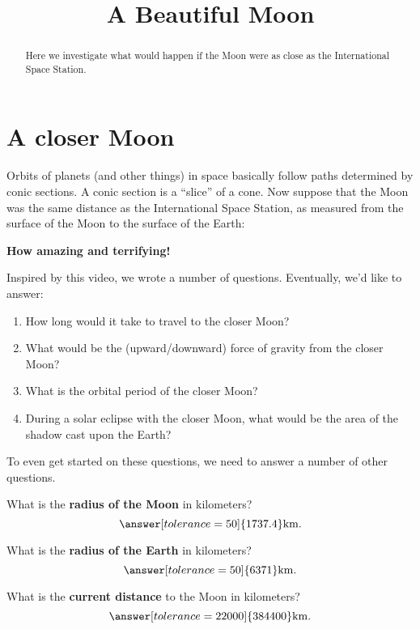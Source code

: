 \documentclass{ximera}
\title{A Beautiful Moon}
\begin{document}
\begin{abstract}
Here we investigate what would happen if the Moon were as close as the
International Space Station.
\end{abstract}
\maketitle

\section{A closer Moon}

Orbits of planets (and other things) in space basically follow paths
determined by conic sections. A conic section is a ``slice'' of a
cone. Now suppose that the Moon was the same distance as the International
Space Station, as measured from the surface of the Moon to the surface
of the Earth: 

\begin{center}
\textbf{How amazing and terrifying!}
\end{center}

Inspired by this video, we wrote a number of questions. Eventually,
we'd like to answer:
\begin{enumerate}
\item How long would it take to travel to the closer Moon?
\item What would be the (upward/downward) force of gravity from the
  closer Moon?
\item What is the orbital period of the closer Moon?
\item During a solar eclipse with the closer Moon, what would be the
  area of the shadow cast upon the Earth?
\end{enumerate}

To even get started on these questions, we need to answer a number of
other questions.

\begin{question}
  What is the \textbf{radius of the Moon} in kilometers?
  \[
  \answer[tolerance=50]{1737.4}\mathrm{km}.
  \]
\end{question}

\begin{question}
  What is the \textbf{radius of the Earth} in kilometers?
  \[
  \answer[tolerance=50]{6371}\mathrm{km}.
  \]
\end{question}


\begin{question}
  What is the \textbf{current distance} to the Moon in kilometers?
  \[
  \answer[tolerance=22000]{384400}\mathrm{km}.
  \]
\end{question}
\end{document}
